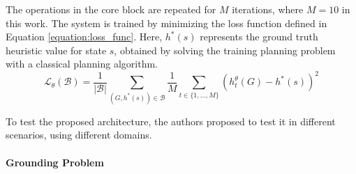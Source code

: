 The operations in the core block are repeated for $M$ iterations, where $M = 10$ in this work.
The system is trained by minimizing the loss function defined in Equation \ref{equation:loss_func}. Here, $h^{*}(s)$ represents the ground truth heuristic value for state $s$, obtained by solving the training planning problem with a classical planning algorithm.
\begin{equation}
    \mathcal{L}_\theta(\mathcal{B})=\frac{1}{|\mathcal{B}|} \sum_{\left(G, h^*(s)\right) \in \mathcal{B}} \frac{1}{M} \sum_{t \in \{1, \ldots, M\}}\left(h_t^\theta(G)-h^*(s)\right)^2
    \label{equation:loss_func}
\end{equation}

To test the proposed architecture, the authors proposed to test it in different scenarios, using different domains. 


\paragraph*{Grounding Problem}\mbox{}\\

